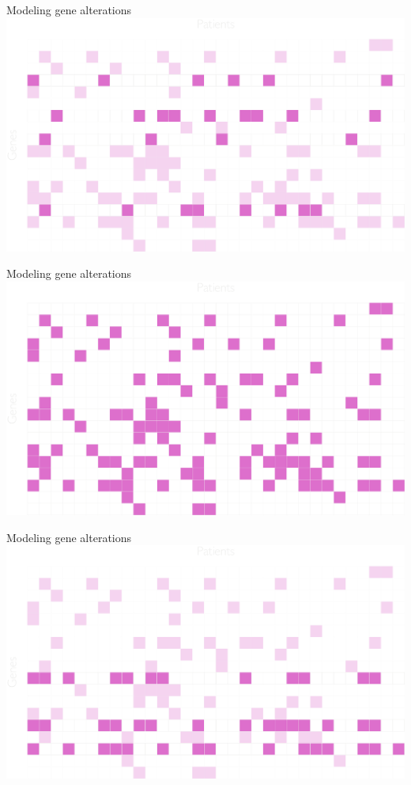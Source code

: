 \documentclass[mathserif]{beamer}
\begin{document}
\begin{frame}{Modeling gene alterations}
\includegraphics[width=\textwidth]{figures/grid_genes_muex.pdf}
\end{frame}

\begin{frame}{Modeling gene alterations}
\centering
\includegraphics[width=\textwidth]{figures/grid_genes.pdf}
\end{frame}

\begin{frame}{Modeling gene alterations}
\includegraphics[width=\textwidth]{figures/grid_genes_cooc.pdf}
\end{frame}
\end{document}
